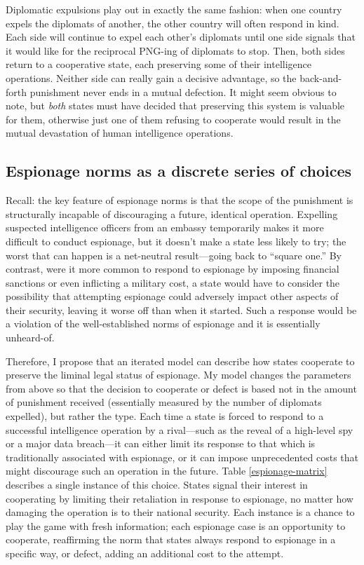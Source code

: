 \documentclass[14pt]{extarticle}
\begin{document}
Diplomatic expulsions play out in exactly the same fashion: when one country expels the diplomats of another, the other country will often respond in kind. Each side will continue to expel each other's diplomats until one side signals that it would like for the reciprocal PNG-ing of diplomats to stop. Then, both sides return to a cooperative state, each preserving some of their intelligence operations. Neither side can really gain a decisive advantage, so the back-and-forth punishment never ends in a mutual defection. It might seem obvious to note, but \emph{both} states must have decided that preserving this system is valuable for them, otherwise just one of them refusing to cooperate would result in the mutual devastation of human intelligence operations.

\subsection{Espionage norms as a discrete series of choices}
Recall: the key feature of espionage norms is that the scope of the punishment is structurally incapable of discouraging a future, identical operation. Expelling suspected intelligence officers from an embassy temporarily makes it more difficult to conduct espionage, but it doesn't make a state less likely to try; the worst that can happen is a net-neutral result---going back to \enquote{square one.} By contrast, were it more common to respond to espionage by imposing financial sanctions or even inflicting a military cost, a state would have to consider the possibility that attempting espionage could adversely impact other aspects of their security, leaving it worse off than when it started. Such a response would be a violation of the well-established norms of espionage and it is essentially unheard-of.

Therefore, I propose that an iterated model can describe how states cooperate to preserve the liminal legal status of espionage. My model changes the parameters from above so that the decision to cooperate or defect is based not in the amount of punishment received (essentially measured by the number of diplomats expelled), but rather the type. Each time a state is forced to respond to a successful intelligence operation by a rival---such as the reveal of a high-level spy or a major data breach---it can either limit its response to that which is traditionally associated with espionage, or it can impose unprecedented costs that might discourage such an operation in the future. Table \ref{espionage-matrix} describes a single instance of this choice. States signal their interest in cooperating by limiting their retaliation in response to espionage, no matter how damaging the operation is to their national security. Each instance is a chance to play the game with fresh information; each espionage case is an opportunity to cooperate, reaffirming the norm that states always respond to espionage in a specific way, or defect, adding an additional cost to the attempt.
\end{document}
